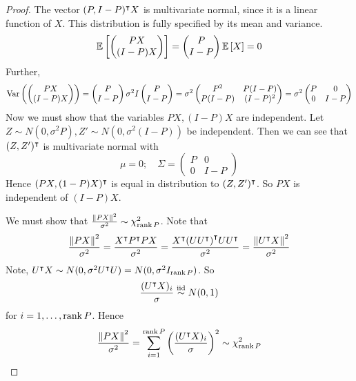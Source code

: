 \begin{proof}
	The vector \( (P, I-P)^\intercal X \) is multivariate normal, since it is a linear function of \( X \).
	This distribution is fully specified by its mean and variance.
	\[
		\mathbb{E}\left[{\begin{pmatrix}
				PX \\
				(I-P)X
			\end{pmatrix}}\right] = \begin{pmatrix}
			P \\
			I-P
		\end{pmatrix} \mathbb{E}\left[{X}\right] = 0
	\]
	Further,
	\[
		\operatorname{Var}\left({\begin{pmatrix}
				PX \\
				(I-P)X
			\end{pmatrix}}\right) = \begin{pmatrix}
			P \\
			I - P
		\end{pmatrix} \sigma^2 I \begin{pmatrix}
			P \\
			I - P
		\end{pmatrix} = \sigma^2 \begin{pmatrix}
			P^2    & P(I-P)  \\
			P(I-P) & (I-P)^2
		\end{pmatrix} = \sigma^2 \begin{pmatrix}
			P & 0   \\
			0 & I-P
		\end{pmatrix}
	\]
	Now we must show that the variables \( PX, (I-P)X \) are independent.
	Let \( Z \sim N(0,\sigma^2 P), Z' \sim N(0,\sigma^2(I-P)) \) be independent.
	Then we can see that \( (Z, Z')^\intercal \) is multivariate normal with
	\[
		\mu = 0;\quad \Sigma = \begin{pmatrix}
			P & 0     \\
			0 & I - P
		\end{pmatrix}
	\]
	Hence \( (PX, (1-P)X)^\intercal \) is equal in distribution to \( (Z, Z')^\intercal \).
	So \( PX \) is independent of \( (I-P)X \).

	We must show that \( \frac{\norm{PX}^2}{\sigma^2} \sim \chi^2_{\rank P} \).
	Note that
	\[
		\frac{\norm{PX}^2}{\sigma^2} = \frac{X^\intercal P^\intercal P X}{\sigma^2} = \frac{X^\intercal \qty(U U^\intercal)^\intercal U U^\intercal}{\sigma^2} = \frac{\norm{U^\intercal X}^2}{\sigma^2}
	\]
	Note, \( U^\intercal X \sim N(0,\sigma^2 U^\intercal U) = N(0,\sigma^2 I_{\rank P}) \).
	So
	\[
		\frac{(U^\intercal X)_i}{\sigma} \overset{\text{iid}}{\sim} N(0,1)
	\]
	for \( i = 1, \dots, \rank P \).
	Hence
	\[
		\frac{\norm{PX}^2}{\sigma^2} = \sum_{i=1}^{\rank P} \qty(\frac{(U^\intercal X)_i}{\sigma})^2 \sim \chi^2_{\rank P}
	\]
\end{proof}
